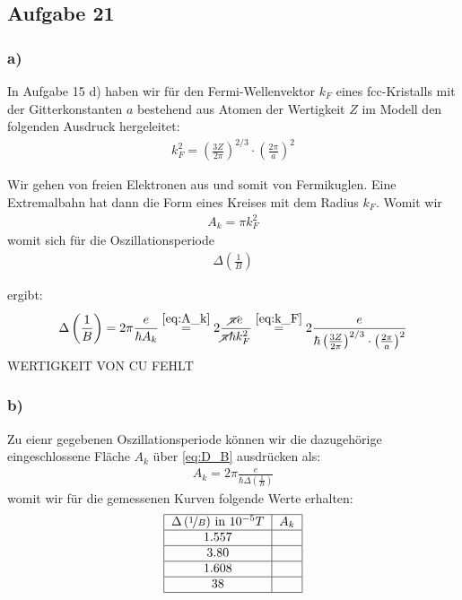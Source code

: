 \subsection*{Aufgabe 21}

\subsubsection*{a)}
In Aufgabe 15 d) haben wir für den Fermi-Wellenvektor $k_F$ eines fcc-Kristalls mit der
Gitterkonstanten $a$ bestehend aus Atomen der Wertigkeit $Z$ im Modell
den folgenden Ausdruck hergeleitet:
\begin{align}
k_F^2 =   
  \left(\frac{3 Z}{2 \pi} \right)^{2/3} \cdot \left(\frac{2 \pi}{a} \right)^2 \label{eq:k_F}
\end{align}

Wir gehen von freien Elektronen aus und somit von Fermikuglen. Eine Extremalbahn hat dann die Form eines Kreises mit dem Radius $k_F$. Womit wir
\begin{align}
 A_k = \pi k_F^2 \label{eq:A_k}
\end{align}
womit sich für die Oszillationsperiode
\begin{align}
 \Delta \left(\frac 1B\right) \label {eq:D_B} 
\end{align}

ergibt:
\begin{align*}
 \Delta \left(\frac 1B\right) = 2\pi\frac{e}{\hbar A_k} \overset{\eqref{eq:A_k}}{=} 2\frac{\cancel{\pi}e}{\cancel{\pi} \hbar k_F^2} \overset{\eqref{eq:k_F}}{=}  
 2\frac{e}{\hbar \left(\frac{3 Z}{2 \pi} \right)^{2/3} \cdot \left(\frac{2 \pi}{a} \right)^2}
\end{align*}
WERTIGKEIT VON CU FEHLT


\subsubsection*{b)}
Zu eienr gegebenen Oszillationsperiode können wir die dazugehörige eingeschlossene Fläche $A_k$ über \eqref{eq:D_B} ausdrücken als:
\begin{align}
 A_k= 2\pi \frac{e}{\hbar \Delta \left(\frac 1B\right)}
\end{align}
womit wir für die gemessenen Kurven folgende Werte erhalten:
\begin{align*}
 \begin{tabular}{|c|c|c}
  \hline
  $\Delta \left(\nicefrac 1B\right)$ in $10^{-5}T$ & $A_k$ \\
   \hline
  1.557 & \\
  \hline
  3.80 & \\
  \hline
  1.608 & \\
  \hline
  38 & \\
  \hline
 \end{tabular}
\end{align*}

